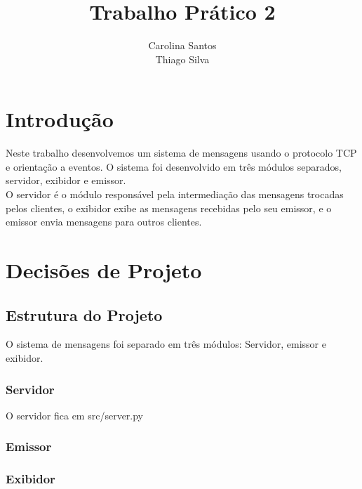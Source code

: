\documentclass[11pt]{article}
\title{\textbf{Trabalho Prático 2}}
\author{Carolina Santos\\
		Thiago Silva}
\date{}
\begin{document}
\maketitle

\section{Introdução}
Neste trabalho desenvolvemos um sistema de mensagens usando o protocolo TCP e orientação a eventos. O sistema foi desenvolvido em três módulos separados, servidor, exibidor e emissor.\\O servidor é o módulo responsável pela intermediação das mensagens trocadas pelos clientes, o exibidor exibe as mensagens recebidas pelo seu emissor, e o emissor envia mensagens para outros clientes.


\section{Decisões de Projeto}
\subsection{Estrutura do Projeto}
O sistema de mensagens foi separado em três módulos: Servidor, emissor e exibidor.

\subsubsection{Servidor}
O servidor fica em src/server.py
\subsubsection{Emissor}
\subsubsection{Exibidor}
\end{document}
